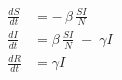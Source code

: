 \documentclass[preview,border=4pt]{standalone}
\begin{document}
\Large
\begin{align*}
  \frac{dS}{dt} &= -\,\beta \, \frac{S I}{N} \\[6pt]
  \frac{dI}{dt} &= \beta \, \frac{S I}{N} \;-\; \gamma I \\[6pt]
  \frac{dR}{dt} &= \gamma I
\end{align*}
\end{document}
